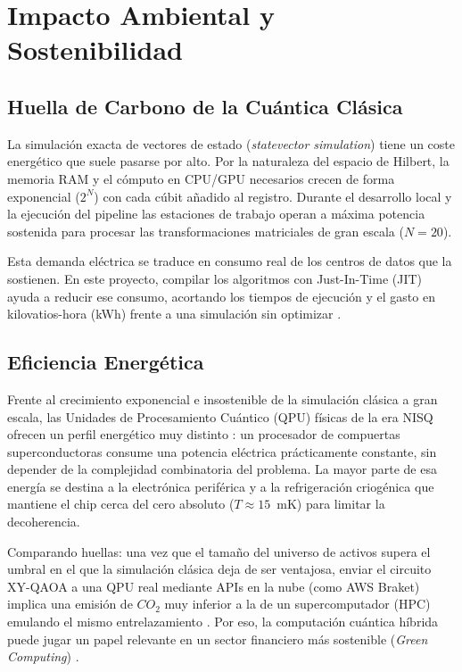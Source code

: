 \section{Impacto Ambiental y Sostenibilidad}
\label{sec:impacto_ambiental_green}

\subsection{Huella de Carbono de la Cuántica Clásica}
La simulación exacta de vectores de estado (\textit{statevector simulation}) tiene un coste energético que suele pasarse por alto. Por la naturaleza del espacio de Hilbert, la memoria RAM y el cómputo en CPU/GPU necesarios crecen de forma exponencial ($2^N$) con cada cúbit añadido al registro. Durante el desarrollo local y la ejecución del pipeline las estaciones de trabajo operan a máxima potencia sostenida para procesar las transformaciones matriciales de gran escala ($N=20$).

Esta demanda eléctrica se traduce en consumo real de los centros de datos que la sostienen. En este proyecto, compilar los algoritmos con Just-In-Time (JIT) ayuda a reducir ese consumo, acortando los tiempos de ejecución y el gasto en kilovatios-hora (kWh) frente a una simulación sin optimizar \cite{GreenQuantum2023}.

\subsection{Eficiencia Energética}
Frente al crecimiento exponencial e insostenible de la simulación clásica a gran escala, las Unidades de Procesamiento Cuántico (QPU) físicas de la era NISQ ofrecen un perfil energético muy distinto \cite{Preskill2018}: un procesador de compuertas superconductoras consume una potencia eléctrica prácticamente constante, sin depender de la complejidad combinatoria del problema. La mayor parte de esa energía se destina a la electrónica periférica y a la refrigeración criogénica que mantiene el chip cerca del cero absoluto ($T \approx 15$~mK) para limitar la decoherencia.

Comparando huellas: una vez que el tamaño del universo de activos supera el umbral en el que la simulación clásica deja de ser ventajosa, enviar el circuito XY-QAOA a una QPU real mediante APIs en la nube (como AWS Braket) implica una emisión de $CO_2$ muy inferior a la de un supercomputador (HPC) emulando el mismo entrelazamiento \cite{GreenQuantum2023}. Por eso, la computación cuántica híbrida puede jugar un papel relevante en un sector financiero más sostenible (\textit{Green Computing}) \cite{GreenQuantum2023}.

